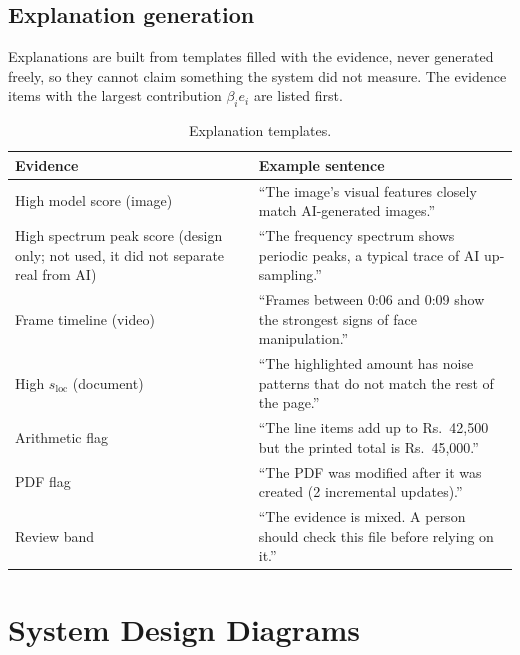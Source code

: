 \documentclass[11pt,a4paper]{article}
\begin{document}
\subsection{Explanation generation}
Explanations are built from templates filled with the evidence, never generated freely, so they
cannot claim something the system did not measure. The evidence items with the largest
contribution $\beta_i e_i$ are listed first.

\begin{table}[htbp]
\centering
\small
\begin{tabularx}{\linewidth}{@{}l Y@{}}
\toprule
\textbf{Evidence} & \textbf{Example sentence} \\
\midrule
High model score (image) & ``The image's visual features closely match AI-generated images.'' \\
High spectrum peak score (design only; not used, it did not separate real from AI) & ``The frequency spectrum shows periodic peaks, a typical trace of AI up-sampling.'' \\
Frame timeline (video) & ``Frames between 0:06 and 0:09 show the strongest signs of face manipulation.'' \\
High $s_{\text{loc}}$ (document) & ``The highlighted amount has noise patterns that do not match the rest of the page.'' \\
Arithmetic flag & ``The line items add up to Rs.~42,500 but the printed total is Rs.~45,000.'' \\
PDF flag & ``The PDF was modified after it was created (2 incremental updates).'' \\
Review band & ``The evidence is mixed. A person should check this file before relying on it.'' \\
\bottomrule
\end{tabularx}
\caption{Explanation templates.}
\label{tab:templates}
\end{table}

\section{System Design Diagrams}
\label{sec:diagrams}
\end{document}
